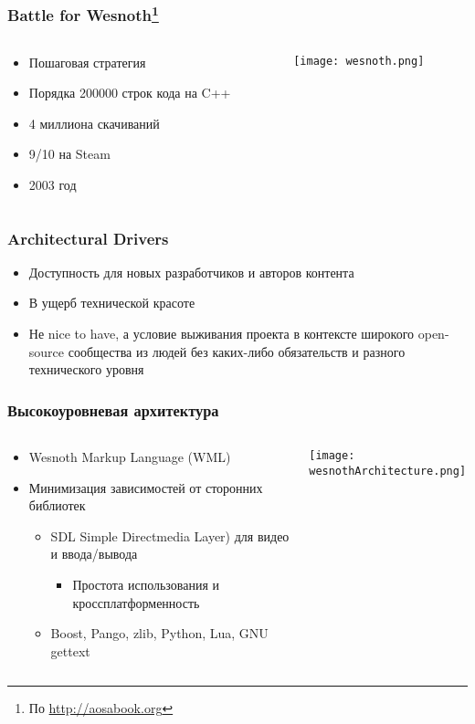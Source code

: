\documentclass{../../slides-style}
\begin{document}
	\begin{frame}
		\frametitle{Battle for Wesnoth\footnote{\tiny{По \url{http://aosabook.org}}}}
		\begin{columns}
			\begin{column}{0.4\textwidth}
				\begin{itemize}
					\item Пошаговая стратегия
					\item Порядка 200000 строк кода на C++
					\item 4 миллиона скачиваний
					\item 9/10 на Steam
					\item 2003 год
				\end{itemize}
			\end{column}
			\begin{column}{0.6\textwidth}
				\texttt{[image: wesnoth.png]}
			\end{column}
		\end{columns}
	\end{frame}

	\begin{frame}
		\frametitle{Architectural Drivers}
		\begin{itemize}
			\item Доступность для новых разработчиков и авторов контента
			\item В ущерб технической красоте
			\item Не nice to have, а условие выживания проекта в контексте широкого open-source сообщества из людей без каких-либо обязательств и разного технического уровня
		\end{itemize}
	\end{frame}

	\begin{frame}
		\frametitle{Высокоуровневая архитектура}
		\begin{columns}
			\begin{column}{0.6\textwidth}
				\begin{itemize}
					\item Wesnoth Markup Language (WML)
					\item Минимизация зависимостей от сторонних библиотек
					\begin{itemize}
						\item SDL Simple Directmedia Layer) для видео и ввода/вывода
						\begin{itemize}
							\item Простота использования и кроссплатформенность
						\end{itemize}
						\item Boost, Pango, zlib, Python, Lua, GNU gettext
					\end{itemize}
				\end{itemize}
			\end{column}
			\begin{column}{0.4\textwidth}
				\texttt{[image: wesnothArchitecture.png]}
			\end{column}
		\end{columns}
	\end{frame}
\end{document}

